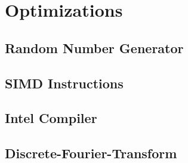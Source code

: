 \section{Optimizations}\label{sec:impl:optimizations}
	
	\subsection{Random Number Generator}
	
	\subsection{SIMD Instructions}

	\subsection{Intel Compiler}
	
	\subsection{Discrete-Fourier-Transform}

	